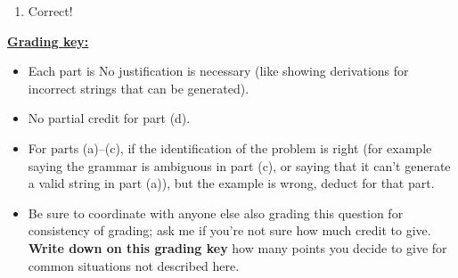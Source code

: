 \documentclass[11pt,fleqn]{article}
\begin{document}
\begin{enumerate}
\begin{multicols}{2}
\begin{enumerate}
                    \columnbreak

              \item Correct!

            \end{enumerate}

            \vspace{-2.5mm}

          \end{multicols}

          \begin{info}{\textbf{\underline{Grading key:}}}

            \begin{itemize}

              \addtolength{\itemsep}{2mm}

              \item Each part is   No justification is
                    necessary (like showing derivations for incorrect
                    strings that can be generated).

              \item No partial credit for part (d).

              \item For parts (a)--(c), if the identification of the problem
                    is right (for example saying the grammar is ambiguous in
                    part (c), or saying that it can't generate a valid
                    string in part (a)), but the example is wrong, deduct
                     for that part.

              \item Be sure to coordinate with anyone else also grading this
                    question for consistency of grading; ask me if you're
                    not sure how much credit to give.  \textbf{Write down on
                    this grading key} how many points you decide to give
                    for common situations not described here.

            \end{itemize}

          \end{info}



\end{enumerate}
\end{document}
